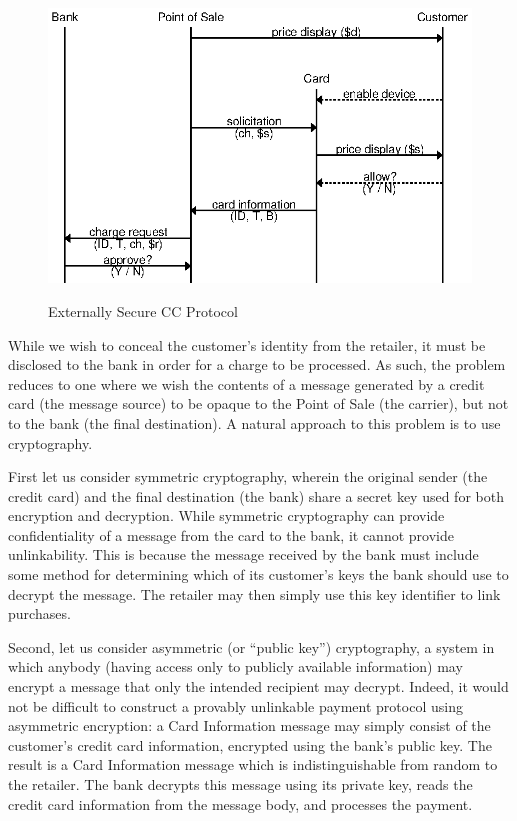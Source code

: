 \begin{figure}[h!]
  \caption{Externally Secure CC Protocol}
  \centering
    \includegraphics{img/secure_ccp.eps}
  \label{fig:external_ccp_recall}
\end{figure}


While we wish to conceal the customer's identity from the retailer, it must be disclosed to the bank in order for a charge to be processed.
As such, the problem reduces to one where we wish the contents of a message generated by a credit card (the message source)
  to be opaque to the Point of Sale (the carrier), but not to the bank (the final destination).
A natural approach to this problem is to use cryptography.

First let us consider symmetric cryptography, wherein the original sender (the credit card) and the final destination (the bank) share a secret key used for both encryption and decryption.
While symmetric cryptography can provide confidentiality of a message from the card to the bank, it cannot provide unlinkability.
This is because the message received by the bank must include some method for determining which of its customer's keys the bank should use to decrypt the message.
The retailer may then simply use this key identifier to link purchases.

Second, let us consider asymmetric (or ``public key'') cryptography,
  a system in which anybody (having access only to publicly available information) may encrypt a message that only the intended recipient may decrypt.
Indeed, it would not be difficult to construct a provably unlinkable payment protocol using asymmetric encryption:
a Card Information message may simply consist of the customer's credit card information, encrypted using the bank's public key.
The result is a Card Information message which is indistinguishable from random to the retailer.
The bank decrypts this message using its private key, reads the credit card information from the message body, and processes the payment.

